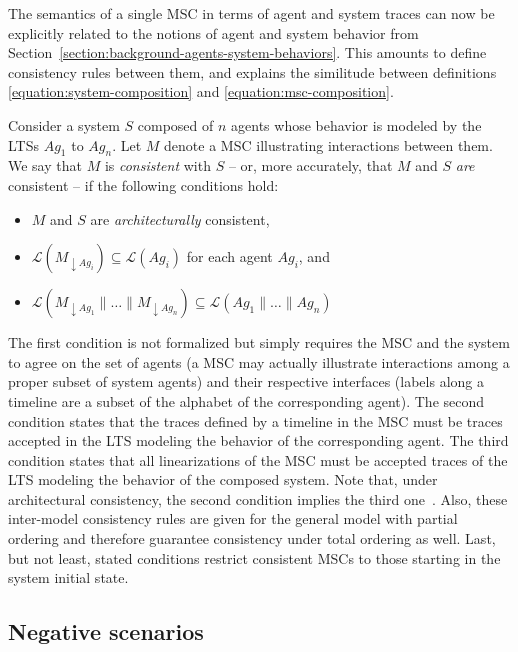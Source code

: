 The semantics of a single MSC in terms of agent and system traces can now be explicitly related to the notions of agent and system behavior from Section~\ref{section:background-agents-system-behaviors}. This amounts to define consistency rules between them, and explains the similitude between definitions \ref{equation:system-composition} and \ref{equation:msc-composition}.

Consider a system $S$ composed of $n$ agents whose behavior is modeled by the LTSs $Ag_1$ to $Ag_n$. Let $M$ denote a MSC illustrating interactions between them. We say that $M$ is \emph{consistent} with $S$ -- or, more accurately, that $M$ and $S$ \emph{are} consistent -- if the following conditions hold:

\begin{itemize}
\item $M$ and $S$ are \emph{architecturally} consistent,
\item $\mathcal{L}(M_{\downarrow Ag_i}) \subseteq \mathcal{L}(Ag_i)$ for each agent $Ag_i$, and
\item $\mathcal{L}(M_{\downarrow Ag_1} \parallel \ldots \parallel M_{\downarrow Ag_n}) \subseteq \mathcal{L}(Ag_1 \parallel \ldots \parallel Ag_n)$
\end{itemize}

The first condition is not formalized but simply requires the MSC and the system to agree on the set of agents (a MSC may actually illustrate interactions among a proper subset of system agents) and their respective interfaces (labels along a timeline are a subset of the alphabet of the corresponding agent). The second condition states that the traces defined by a timeline in the MSC must be traces accepted in the LTS modeling the behavior of the corresponding agent. The third condition states that all linearizations of the MSC must be accepted traces of the LTS modeling the behavior of the composed system. Note that, under architectural consistency, the second condition implies the third one~\cite{Uchitel:2003}. Also, these inter-model consistency rules are given for the general model with partial ordering and therefore guarantee consistency under total ordering as well. Last, but not least, stated conditions restrict consistent MSCs to those starting in the system initial state.

\subsection{Negative scenarios}

